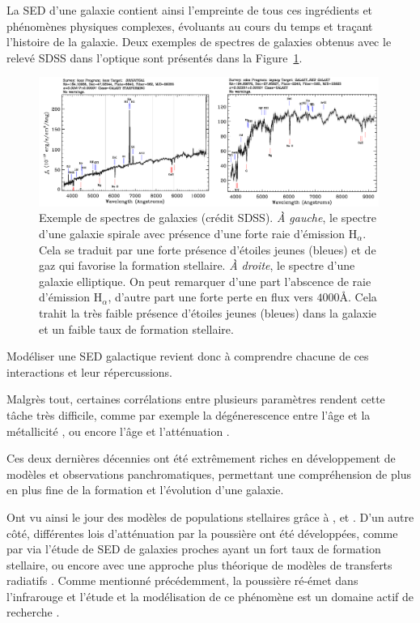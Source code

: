 \documentclass[../main/main.tex]{subfiles}
\begin{document}
La SED d'une galaxie contient ainsi l'empreinte de tous ces ingrédients
et phénomènes physiques complexes, évoluants au cours du temps et traçant
l'histoire de la galaxie. Deux exemples de spectres de galaxies obtenus
avec le relevé SDSS dans l'optique sont
présentés dans la Figure~\ref{fig:specgalsdss}.

\begin{figure}
  \centering
  \includegraphics[width=0.99\textwidth]{../figures/04_hypergal/specgalsdss.png}
  \caption[Exemple de spectres de galaxies]{Exemple de spectres de
    galaxies (crédit SDSS). \textit{À gauche}, le spectre d'une galaxie
    spirale avec présence d'une forte raie d'émission
    $\text{H}_{\alpha}$. Cela se traduit par une forte présence d'étoiles
  jeunes (bleues) et de gaz qui favorise la formation stellaire. \textit{À droite},
le spectre d'une galaxie elliptique. On peut remarquer d'une part
l'abscence de raie d'émission $\text{H}_{\alpha}$, d'autre part une
forte perte en flux vers $4000$\AA. Cela trahit la très faible présence
d'étoiles jeunes (bleues) dans la galaxie et un faible taux de formation
stellaire.}
  \label{fig:specgalsdss}
\end{figure}

Modéliser une SED galactique revient donc à comprendre chacune de ces
interactions et leur répercussions.

Malgrès tout, certaines corrélations entre plusieurs paramètres rendent cette tâche
très difficile, comme par exemple la dégénerescence entre l'âge et la
métallicité \citep{Worthey}, ou encore l'âge et l'atténuation
\citep{Papovich}.

Ces deux dernières décennies ont été extrêmement riches en développement de modèles
et observations panchromatiques, permettant une compréhension de plus en
plus fine de la formation et l'évolution d'une galaxie.

Ont vu ainsi le jour des modèles de populations stellaires grâce à
\citet{Fioc1997}, \citet{BruzualCharlot2003} et \citet{Maraston2005}.
D'un autre côté, différentes lois d'atténuation par la poussière ont été
développées, comme par \citet{Calzetti1994,Calzetti2000} via l'étude de SED de
galaxies proches ayant un fort taux de formation stellaire, ou encore
avec une approche plus théorique de modèles de transferts radiatifs
\citep{WittGordon}.
Comme mentionné précédemment, la poussière ré-émet dans l'infrarouge et
l'étude et la modélisation de ce phénomène est un domaine actif de
recherche \citep{Casey2012, Dale2014, Draine2007, CharyElbaz}.
\end{document}
